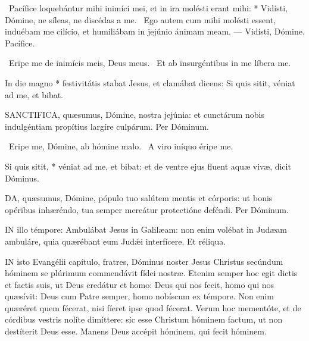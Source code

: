 \R\ Pacífice loquebántur mihi inimíci mei, et in ira molésti erant mihi: * Vidísti, Dómine, ne síleas, ne discédas a me. \V\ Ego autem cum mihi molésti essent, induébam me cilício, et humiliábam in jejúnio ánimam meam. --- Vidísti, Dómine. Pacífice.

\V\ Eripe me de inimícis meis, Deus meus. \R\ Et ab insurgéntibus in me líbera me.

 In die magno * festivitátis stabat Jesus, et clamábat dicens: Si quis sitit, véniat ad me, et bibat.


\lettrine[lines=2]{S}{ANCTIFICA}, quæsumus, Dómine, nostra jejúnia: et cunctárum nobis indulgéntiam propítius largíre culpárum. Per Dóminum.

\V\ Eripe me, Dómine, ab hómine malo. \R\ A viro iníquo éripe me.

 Si quis sitit, * véniat ad me, et bibat: et de ventre ejus fluent aquæ vivæ, dicit Dóminus.


\lettrine[lines=2]{D}{A}, quæsumus, Dómine, pópulo tuo salútem mentis et córporis: ut bonis opéribus inhæréndo, tua semper mereátur protectióne deféndi. Per Dóminum.

\sectionornament




\lettrine[lines=2]{I}{N} illo témpore: Ambulábat Jesus in Galilæam: non enim volébat in Judæam ambuláre, quia quærébant eum Judǽi interfícere. Et réliqua.



\lettrine[lines=2]{I}{N} isto Evangélii capítulo, fratres, Dóminus noster Jesus Christus secúndum hóminem se plúrimum commendávit fídei nostræ. Etenim semper hoc egit dictis et factis suis, ut Deus credátur et homo: Deus qui nos fecit, homo qui nos quæsívit: Deus cum Patre semper, homo nobíscum ex témpore. Non enim quæréret quem fécerat, nisi fíeret ipse quod fécerat. Verum hoc mementóte, et de córdibus vestris nolíte dimíttere: sic esse Christum hóminem factum, ut non destíterit Deus esse. Manens Deus accépit hóminem, qui fecit hóminem.


